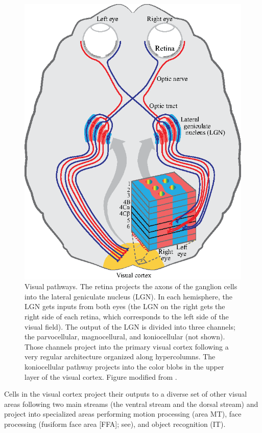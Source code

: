 \begin{figure}[t]
    \centerline{
        \includegraphics[width=.7\linewidth]{figures/taxonomy/visual_pathways_aina.eps}
    }
    \caption{Visual pathways. The retina projects the axons of the ganglion cells into the lateral geniculate nucleus (LGN). In each hemisphere, the LGN gets inputs from both eyes (the LGN on the right gets the right side of each retina, which corresponds to the left side of the visual field). The output of the LGN is divided into three channels; the parvocellular, magnocellural, and koniocellular (not shown). Those channels project into the primary visual cortex following a very regular architecture organized along hypercolumns. The koniocellular pathway projects into the color blobs in the upper layer of the visual cortex. Figure modified from \cite{kandel:neural}.}
    \label{fig:visual_pathways}
\end{figure}



Cells in the visual cortex project their outputs to a diverse set of other visual areas following two main streams (the ventral stream and the dorsal stream) and project into specialized areas performing motion processing (area MT), face processing (fusiform face area [FFA]; see\cite{Kanwisher1997TheFF}), and object recognition (IT).

